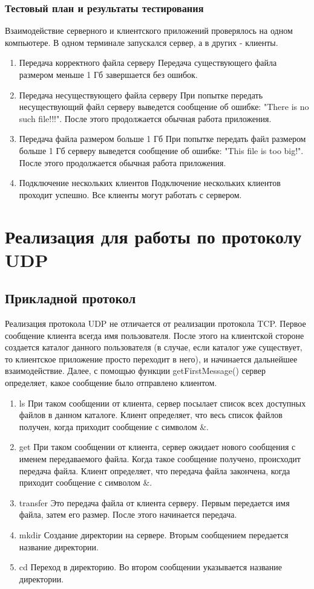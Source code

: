 \documentclass[12pt,a4paper]{report}
\begin{document}
\subsection{Тестовый план и результаты тестирования}
Взаимодействие серверного и клиентского приложений проверялось на одном компьютере. В одном терминале запускался сервер, а в других - клиенты.
\begin{enumerate}
\item{Передача корректного файла серверу}
Передача существующего файла размером меньше 1 Гб завершается без ошибок. 
\item{Передача несуществующего файла серверу}
При попытке передать несуществующий файл серверу выведется сообщение об ошибке: "There is no such file!!!". После этого продолжается обычная работа приложения.
\item{Передача файла размером больше 1 Гб}
При попытке передать файл размером больше 1 Гб серверу выведется сообщение об ошибке: "This file is too big!". После этого продолжается обычная работа приложения. 
\item{Подключение нескольких клиентов}
Подключение нескольких клиентов проходит успешно. Все клиенты могут работать с сервером.
\end{enumerate}

\chapter{Реализация для работы по протоколу UDP}
\section{Прикладной протокол}

Реализация протокола UDP не отличается от реализации протокола TCP. Первое сообщение клиента всегда имя пользователя. После этого на клиентской стороне создается каталог данного пользователя (в случае, если каталог уже существует, то клиентское приложение просто переходит в него), и начинается дальнейшее взаимодействие.
Далее, с помощью функции getFirstMessage() сервер определяет, какое сообщение было отправлено клиентом. 
\begin{enumerate}
\item{ls}
При таком сообщении от клиента, сервер посылает список всех доступных файлов в данном каталоге. Клиент определяет, что весь список файлов получен, когда приходит сообщение с символом \&.
\item{get}
При таком сообщении от клиента, сервер ожидает нового сообщения с именем передаваемого файла. Когда такое сообщение получено, происходит передача файла. Клиент определяет, что передача файла закончена, когда приходит сообщение с символом \&.
\item{transfer}
Это передача файла от клиента серверу. Первым передается имя файла, затем его размер. После этого начинается передача.
\item{mkdir}
Создание директории на сервере. Вторым сообщением передается название директории.
\item{cd}
Переход в директорию. Во втором сообщении указывается название директории.
\end{enumerate}
\end{document}
